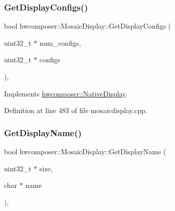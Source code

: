 \subsubsection{\texorpdfstring{Get\+Display\+Configs()}{GetDisplayConfigs()}}
{\footnotesize\ttfamily bool hwcomposer\+::\+Mosaic\+Display\+::\+Get\+Display\+Configs (\begin{DoxyParamCaption}\item[{uint32\+\_\+t $\ast$}]{num\+\_\+configs,  }\item[{uint32\+\_\+t $\ast$}]{configs }\end{DoxyParamCaption})\hspace{0.3cm}{\ttfamily [override]}, {\ttfamily [virtual]}}



Implements \mbox{\hyperlink{classhwcomposer_1_1NativeDisplay_a9479dcf82765996db6d7ea1cdcef3864}{hwcomposer\+::\+Native\+Display}}.



Definition at line 483 of file mosaicdisplay.\+cpp.


\begin{DoxyCode}{0}
\end{DoxyCode}
\mbox{\label{classhwcomposer_1_1MosaicDisplay_ac76216611bf8bebcf182a1c18b3d0c04}} 
\subsubsection{\texorpdfstring{Get\+Display\+Name()}{GetDisplayName()}}
{\footnotesize\ttfamily bool hwcomposer\+::\+Mosaic\+Display\+::\+Get\+Display\+Name (\begin{DoxyParamCaption}\item[{uint32\+\_\+t $\ast$}]{size,  }\item[{char $\ast$}]{name }\end{DoxyParamCaption})\hspace{0.3cm}{\ttfamily [override]}, {\ttfamily [virtual]}}



